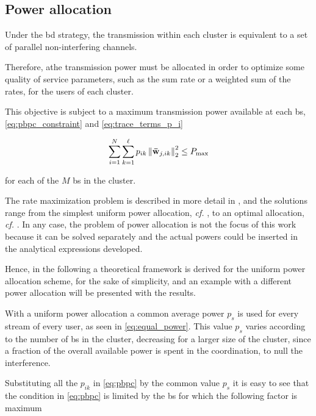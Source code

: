 \subsection{Power allocation}\label{ssec:achiev_rate_power}

Under the \gls{bd} strategy, the transmission within each cluster is equivalent
to a set of parallel non-interfering channels.

Therefore, athe transmission power must be allocated in order to optimize some
quality of service parameters, such as the sum rate or a weighted sum of the
rates, for the users of each cluster.

This objective is subject to a maximum transmission power available at each
\gls{bs}, \eqref{eq:pbpc_constraint} and \eqref{eq:trace_terms_p_i}

\begin{equation} \label{eq:pbpc}
	\sum\limits_{i = 1}^N \sum\limits_{k = 1}^\ell p_{ik} \left\| \mathbf{\bar{w}}_{j, ik}
    \right\|_2^2 \leq P_{\max}
\end{equation}

\noindent
for each of the $M$ \gls{bs} in the cluster.

The rate maximization problem is described in more detail in
, and the solutions range from the simplest uniform
power allocation, \emph{cf.} , to an optimal
allocation, \emph{cf.} . In any case, the
problem of power allocation is not the focus of this work because it can be
solved separately and the actual powers could be inserted in the analytical
expressions developed.

Hence, in the following a theoretical framework is derived for the uniform power
allocation scheme, for the sake of simplicity, and an example with a different
power allocation will be presented with the results.

With a uniform power allocation a common average power $p_s$ is used for every
stream of every user, as seen in \eqref{eq:equal_power}. This value $p_s$ varies
according to the number of \gls{bs} in the cluster, decreasing for a larger size
of the cluster, since a fraction of the overall available power is spent in the
coordination, to null the interference.

Substituting all the $p_{ik}$ in \eqref{eq:pbpc} by the common value $p_s$ it is
easy to see that the condition in \eqref{eq:pbpc} is limited by the \gls{bs} for
which the following factor is maximum

